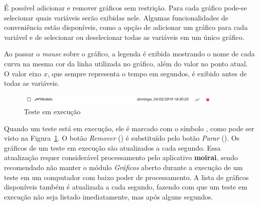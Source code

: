 É possível adicionar e remover gráficos sem restrição. Para cada gráfico pode-se
selecionar quais variáveis serão exibidas nele. Algumas funcionalidades de
conveniência estão disponíveis, como a opção de adicionar um gráfico para cada
variável e de selecionar ou deselecionar todas as variáveis em um único gráfico.

Ao passar o \textit{mouse} sobre o gráfico, a legenda é exibida mostrando o nome
de cada curva na mesma cor da linha utilizada no gráfico, além do valor no ponto
atual. O valor eixo \(x\), que sempre representa o tempo em segundos, é exibido
antes de todas as variáveis.

\begin{figure}[ht!]
    \centering
    \includegraphics[width=0.9\textwidth]{imgs/graphs4}
    \caption[Teste em execução]{Teste em execução}%
    \label{fig:graphs4}
\end{figure}

Quando um teste está em execução, ele é marcado com o símbolo
, como pode ser visto na Figura~\ref{fig:graphs4}. O botão
\textit{Remover} () é substituído pelo botão \textit{Parar}
(). Os gráficos de um teste em execução são atualizados a cada
segundo. Essa atualização requer considerável processamento pelo aplicativo
\textbf{moirai}, sendo recomendado não manter o módulo \textit{Gráficos} aberto
durante a execução de um teste em um computador com baixo poder de
processamento. A lista de gráficos disponíveis também é atualizada a cada
segundo, fazendo com que um teste em execução não seja listado imediatamente,
mas após alguns segundos.
